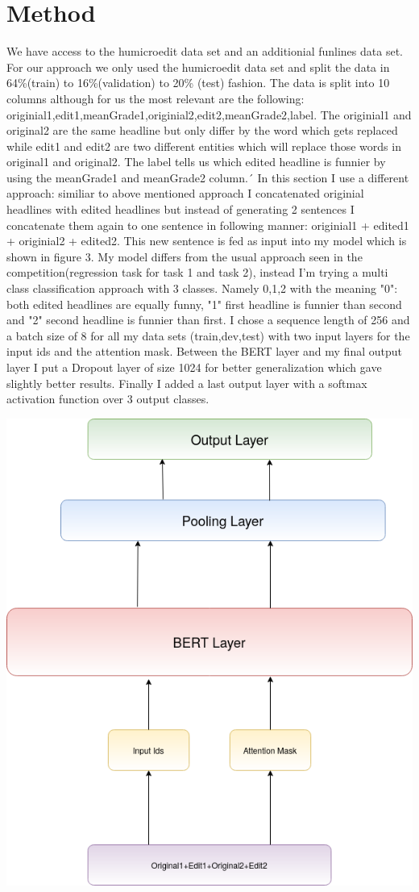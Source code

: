 \documentclass[11pt,a4paper,onecolumn,oneside,notitlepage]{article}
\begin{document}
	\section{Method}
		We have access to the humicroedit data set and an additionial funlines data set.
		For our approach we only used the humicroedit data set and split the data in 64\%(train) to 16\%(validation) to 20\% (test) fashion. The data is split into 10 columns although for us the most relevant are the following: originial1,edit1,meanGrade1,originial2,edit2,meanGrade2,label.
		The originial1 and original2 are the same headline but  only differ by the word which gets replaced while edit1 and edit2 are two different entities which will replace those words in original1 and original2. The label tells us which edited headline is funnier by using the meanGrade1 and meanGrade2 column.´
		In this section I use a different approach: similiar to above mentioned approach I concatenated originial headlines with edited headlines but instead of generating 2 sentences I concatenate them again to one sentence in following manner: originial1 + edited1 + originial2 + edited2.
		This new sentence is fed as input into my model which is shown in figure 3.
		My model differs from the usual approach seen in the competition(regression task for task 1 and task 2), instead I'm trying a multi class classification approach with 3 classes. Namely 0,1,2 with the meaning "0": both edited headlines are equally funny, "1" first headline is funnier than second and "2" second headline is funnier than first.
		I chose a sequence length of 256 and a batch size of 8 for all my data sets (train,dev,test) with two input layers for the input ids and the attention mask.
		Between the BERT layer and my final output layer I put a Dropout layer of size 1024 for better generalization which gave slightly better results. 
		Finally I added a last output layer with a softmax activation function over 3 output classes.
	

		\includegraphics[width=0.5\linewidth]{My_Model_Architecture.png}
\end{document}
